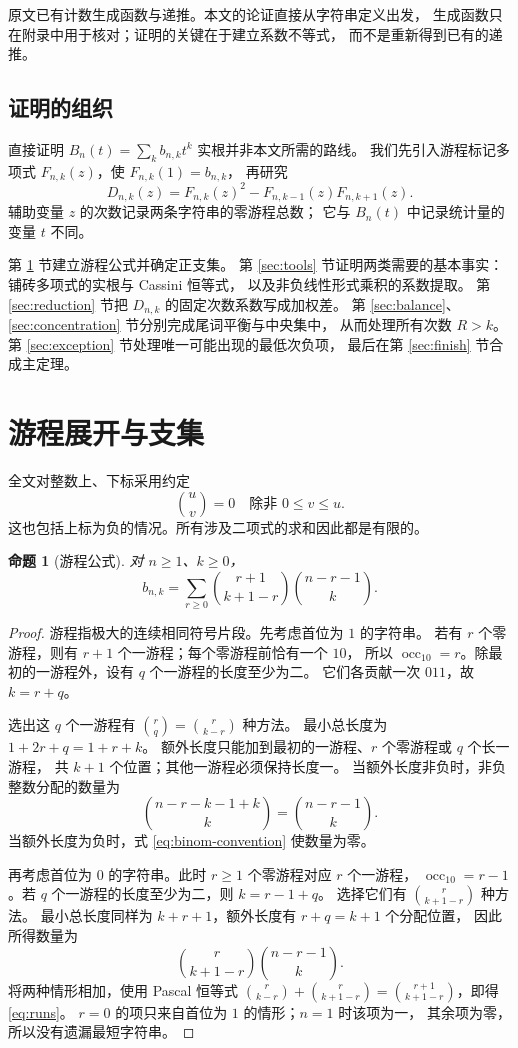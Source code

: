 \documentclass[UTF8,a4paper,11pt,fontset=none]{ctexart}
\numberwithin{equation}{section}
\theoremstyle{paperplain}
\newtheorem{proposition}[theorem]{命题}
\theoremstyle{definition}
\theoremstyle{remark}
\DeclareMathOperator{\occ}{occ}
\begin{document}
原文已有计数生成函数与递推。本文的论证直接从字符串定义出发，
生成函数只在附录中用于核对；证明的关键在于建立系数不等式，
而不是重新得到已有的递推。

\subsection{证明的组织}
直接证明 $B_n(t)=\sum_kb_{n,k}t^k$ 实根并非本文所需的路线。
我们先引入游程标记多项式 $F_{n,k}(z)$，使 $F_{n,k}(1)=b_{n,k}$，
再研究
\[
D_{n,k}(z)=F_{n,k}(z)^2-F_{n,k-1}(z)F_{n,k+1}(z).
\]
辅助变量 $z$ 的次数记录两条字符串的零游程总数；
它与 $B_n(t)$ 中记录统计量的变量 $t$ 不同。

第 \ref{sec:runs} 节建立游程公式并确定正支集。
第 \ref{sec:tools} 节证明两类需要的基本事实：铺砖多项式的实根与 Cassini 恒等式，
以及非负线性形式乘积的系数提取。
第 \ref{sec:reduction} 节把 $D_{n,k}$ 的固定次数系数写成加权差。
第 \ref{sec:balance}、\ref{sec:concentration} 节分别完成尾词平衡与中央集中，
从而处理所有次数 $R>k$。
第 \ref{sec:exception} 节处理唯一可能出现的最低次负项，
最后在第 \ref{sec:finish} 节合成主定理。

\section{游程展开与支集}\label{sec:runs}
全文对整数上、下标采用约定
\begin{equation}\label{eq:binom-convention}
\binom uv=0\quad\text{除非 }0\le v\le u.
\end{equation}
这也包括上标为负的情况。所有涉及二项式的求和因此都是有限的。

\begin{proposition}[游程公式]\label{prop:runs}
对 $n\ge1$、$k\ge0$，
\begin{equation}\label{eq:runs}
b_{n,k}=\sum_{r\ge0}
\binom{r+1}{k+1-r}\binom{n-r-1}{k}.
\end{equation}
\end{proposition}
\begin{proof}
游程指极大的连续相同符号片段。先考虑首位为 $1$ 的字符串。
若有 $r$ 个零游程，则有 $r+1$ 个一游程；每个零游程前恰有一个 $10$，
所以 $\occ_{10}=r$。除最初的一游程外，设有 $q$ 个一游程的长度至少为二。
它们各贡献一次 $011$，故 $k=r+q$。

选出这 $q$ 个一游程有 $\binom rq=\binom r{k-r}$ 种方法。
最小总长度为 $1+2r+q=1+r+k$。
额外长度只能加到最初的一游程、$r$ 个零游程或 $q$ 个长一游程，
共 $k+1$ 个位置；其他一游程必须保持长度一。
当额外长度非负时，非负整数分配的数量为
\[
\binom{n-r-k-1+k}{k}=\binom{n-r-1}{k}.
\]
当额外长度为负时，式 \eqref{eq:binom-convention} 使数量为零。

再考虑首位为 $0$ 的字符串。此时 $r\ge1$ 个零游程对应 $r$ 个一游程，
$\occ_{10}=r-1$。若 $q$ 个一游程的长度至少为二，则 $k=r-1+q$。
选择它们有 $\binom r{k+1-r}$ 种方法。
最小总长度同样为 $k+r+1$，额外长度有 $r+q=k+1$ 个分配位置，
因此所得数量为
\[
\binom r{k+1-r}\binom{n-r-1}{k}.
\]
将两种情形相加，使用 Pascal 恒等式
$\binom r{k-r}+\binom r{k+1-r}=\binom{r+1}{k+1-r}$，即得 \eqref{eq:runs}。
$r=0$ 的项只来自首位为 $1$ 的情形；$n=1$ 时该项为一，
其余项为零，所以没有遗漏最短字符串。
\end{proof}
\end{document}
